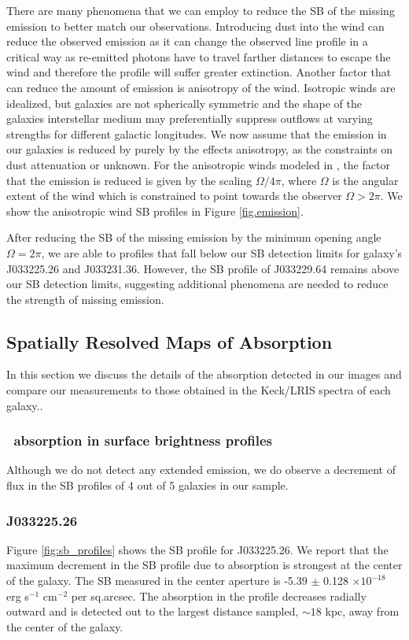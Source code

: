 \documentclass[twocolumn]{aastex61}
\begin{document}
There are many phenomena that we can employ to reduce the SB of the missing  emission to better match our observations. Introducing dust into the wind can reduce the observed emission as it can change the observed line profile in a critical way as re-emitted photons have to travel farther distances to escape the wind and therefore the profile will suffer greater extinction. Another factor that can reduce the amount of emission is anisotropy of the wind. Isotropic winds are idealized, but galaxies are not spherically symmetric and the shape of the galaxies interstellar medium may preferentially suppress outflows at varying strengths for different galactic longitudes. We now assume that the emission in our galaxies is reduced by purely by the effects anisotropy, as the constraints on dust attenuation or unknown. For the anisotropic winds modeled in \cite{Prochaska_2011}, the factor that the emission is reduced is given by the scaling $\Omega/4\pi$, where $\Omega$ is the angular extent of the wind which is constrained to point towards the observer $\Omega > 2\pi$. We show the anisotropic wind SB profiles in Figure  \ref{fig.emission}.

After reducing the SB of the missing  emission by the minimum opening angle $\Omega=2\pi$, we are able to profiles that fall below our SB detection limits for galaxy's J033225.26 and J033231.36. However, the SB profile of J033229.64 remains above our SB detection limits, suggesting additional phenomena are needed to reduce the strength of missing emission.



\subsection{Spatially Resolved Maps of  Absorption}
In this section we discuss the details of the absorption detected in our images and compare our measurements to those obtained in the Keck/LRIS spectra of each galaxy.. 

\subsubsection{\ absorption in surface brightness profiles}
Although we do not detect any extended  emission, we do observe a decrement of flux in the SB profiles of 4 out of 5 galaxies in our sample. 

\subsubsection{J033225.26} 
Figure \ref{fig:sb_profiles} shows the SB profile for J033225.26. We report that the maximum decrement in the SB profile due to absorption is strongest at the center of the galaxy. The SB measured in the center aperture is -5.39 $\pm$ 0.128 $\times10^{-18}$ erg s$^{-1}$ cm$^{-2}$ per sq.arcsec. The absorption in the profile decreases radially outward and is detected out to the largest distance sampled, $\sim 18$ kpc, away from the center of the galaxy.
\end{document}
